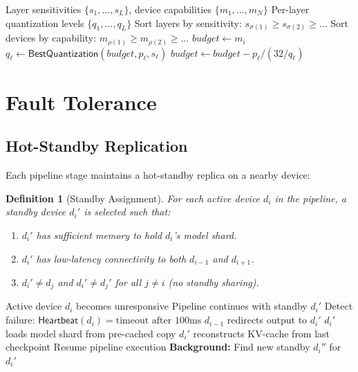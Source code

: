 \documentclass[11pt,a4paper]{article}
\newtheorem{definition}{Definition}
\begin{document}
\begin{algorithm}[H]
\caption{Sensitivity-Aware Quantization Assignment}
\label{alg:quant-assign}
\begin{algorithmic}[1]
\Require Layer sensitivities $\{s_1, \ldots, s_L\}$, device capabilities $\{m_1, \ldots, m_N\}$
\Ensure Per-layer quantization levels $\{q_1, \ldots, q_L\}$
\State Sort layers by sensitivity: $s_{\sigma(1)} \geq s_{\sigma(2)} \geq \ldots$
\State Sort devices by capability: $m_{\rho(1)} \geq m_{\rho(2)} \geq \ldots$
    \State $\mathit{budget} \leftarrow m_i$
        \State $q_\ell \leftarrow \mathsf{BestQuantization}(\mathit{budget}, p_\ell, s_\ell)$
        \State $\mathit{budget} \leftarrow \mathit{budget} - p_\ell / (32 / q_\ell)$
    \EndFor
\EndFor
\end{algorithmic}
\end{algorithm}

\section{Fault Tolerance}

\subsection{Hot-Standby Replication}

Each pipeline stage maintains a hot-standby replica on a nearby device:

\begin{definition}[Standby Assignment]
For each active device $d_i$ in the pipeline, a standby device $d_i'$ is selected such that:
\begin{enumerate}
    \item $d_i'$ has sufficient memory to hold $d_i$'s model shard.
    \item $d_i'$ has low-latency connectivity to both $d_{i-1}$ and $d_{i+1}$.
    \item $d_i' \neq d_j$ and $d_i' \neq d_j'$ for all $j \neq i$ (no standby sharing).
\end{enumerate}
\end{definition}

\begin{algorithm}[H]
\caption{Failover Protocol}
\label{alg:failover}
\begin{algorithmic}[1]
\Require Active device $d_i$ becomes unresponsive
\Ensure Pipeline continues with standby $d_i'$
\State Detect failure: $\mathsf{Heartbeat}(d_i) = \text{timeout after 100ms}$
\State $d_{i-1}$ redirects output to $d_i'$
\State $d_i'$ loads model shard from pre-cached copy
\State $d_i'$ reconstructs KV-cache from last checkpoint
\State Resume pipeline execution
\State \textbf{Background:} Find new standby $d_i''$ for $d_i'$
\end{algorithmic}
\end{algorithm}
\end{document}
